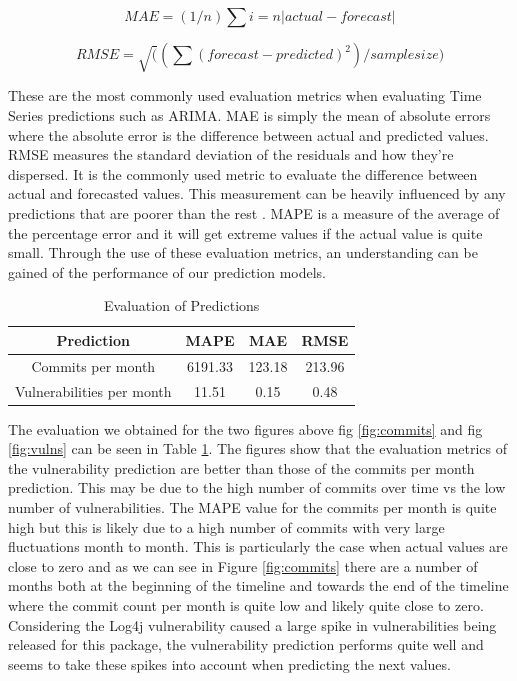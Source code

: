 \documentclass[conference]{IEEEtran}
\begin{document}
\[ MAE = (1/n) \sum{i=n} |actual - forecast| \]

\[ RMSE = \sqrt( (\sum (forecast - predicted) ^ 2) / sample size )  \]

These are the most commonly used evaluation metrics when evaluating Time Series predictions such as ARIMA. MAE is simply the mean of absolute errors where the absolute error is the difference between actual and predicted values. RMSE measures the standard deviation of the residuals and how they're dispersed. It is the commonly used metric to evaluate the difference between actual and forecasted values. This measurement can be heavily influenced by any predictions that are poorer than the rest \cite{f_abdulhafidh_dael_performance_2022}. MAPE is a measure of the average of the percentage error and it will get extreme values if the actual value is quite small. Through the use of these evaluation metrics, an understanding can be gained of the performance of our prediction models. 

\begin{table}
 \caption{Evaluation of Predictions}
\label{evaluations}
\begin{center}
\begin{tabular}{|c|c|c|c|}
\hline
    \textbf{Prediction} & \textbf{MAPE} & \textbf{MAE} & \textbf{RMSE} \\ \hline
    Commits per month & 6191.33 & 123.18 & 213.96 \\ \hline
    Vulnerabilities per month & 11.51 & 0.15 & 0.48 \\ \hline
\end{tabular}
\end{center}
\end{table}

The evaluation we obtained for the two figures above fig \ref{fig:commits} and fig \ref{fig:vulns} can be seen in Table \ref{evaluations}. The figures show that the evaluation metrics of the vulnerability prediction are better than those of the commits per month prediction. This may be due to the high number of commits over time vs the low number of vulnerabilities. The MAPE value for the commits per month is quite high but this is likely due to a high number of commits with very large fluctuations month to month. This is particularly the case when actual values are close to zero and as we can see in Figure \ref{fig:commits} there are a number of months both at the beginning of the timeline and towards the end of the timeline where the commit count per month is quite low and likely quite close to zero. Considering the Log4j vulnerability caused a large spike in vulnerabilities being released for this package, the vulnerability prediction performs quite well and seems to take these spikes into account when predicting the next values. 
\end{document}
